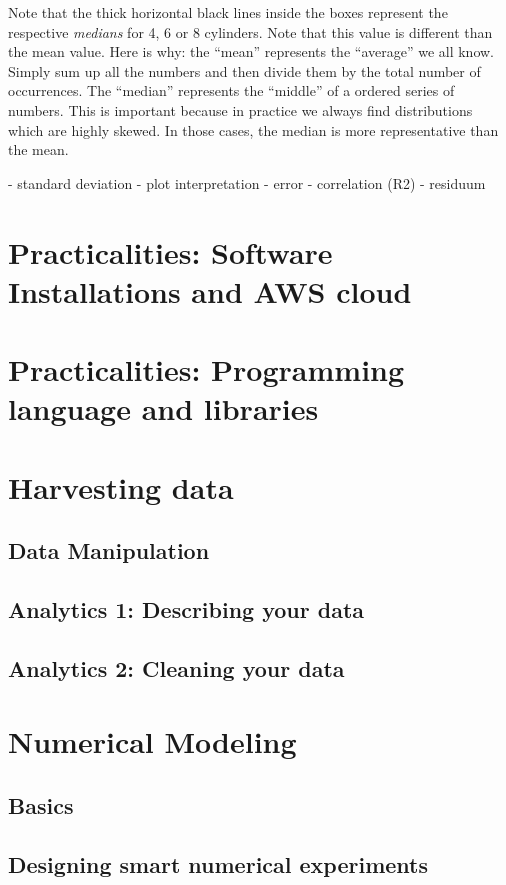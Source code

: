 \documentclass[10pt]{PhDthesisPSnPDF}%
\begin{document}
Note that the thick horizontal black lines inside the boxes represent the respective \textit{medians} for 4, 6 or 8 cylinders. Note that this value is different than the mean value. Here is why: the ``mean'' represents the ``average'' we all know. Simply sum up all the numbers and then divide them by the total number of occurrences. The ``median'' represents the ``middle'' of a ordered series of numbers. This is important because in practice we always find distributions which are highly skewed. In those cases, the median is more representative than the mean.



- standard deviation
- plot interpretation
- error
- correlation (R2)
- residuum
 


\chapter{Practicalities: Software Installations and AWS cloud}\label{P1}
\chapter{Practicalities: Programming language and libraries}\label{P2}
\chapter{Harvesting data} \label{harvesting}
\section{Data Manipulation}\label{dataM} 
\section{Analytics 1: Describing your data}\label{Analy.1}
\section{Analytics 2: Cleaning your data}\label{Analy.2}
\chapter{Numerical Modeling}\label{numerics}
\section{Basics}\label{numBasics}
\section{Designing smart numerical experiments}\label{NumDesign}
\end{document}
